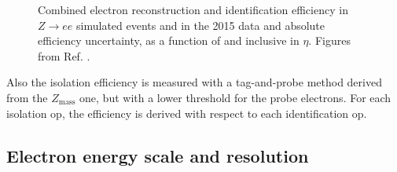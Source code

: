 \begin{figure}[h]
\begin{center}
\end{center}
 \caption{ Combined electron reconstruction and identification efficiency in $Z\rightarrow e e$ simulated events and in the 2015 data and  absolute efficiency uncertainty, as a function of \et and inclusive in $\eta$. Figures from Ref. \cite{ATLAS:2016iqc}. 
 }
  \label{fig:obj:ele_eff}
\end{figure}

Also the isolation efficiency is measured with a tag-and-probe method derived from the $Z_\mathrm{mass}$ one, but with a lower \et threshold for the 
probe electrons. For each isolation \gls{op}, the efficiency is derived with respect to each identification \gls{op}.

\subsection{Electron energy scale and resolution}
\label{sec:obj:ele_energy}

